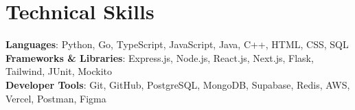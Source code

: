\section{Technical Skills}
\begin{itemize}[leftmargin=0.15in, label={}]
    \small{\item{     
        \textbf{Languages}{: Python, Go, TypeScript, JavaScript, Java, C++, HTML, CSS, SQL} \\
     
        \textbf{Frameworks \& Libraries}{: Express.js, Node.js, React.js, Next.js, Flask, Tailwind, JUnit, Mockito} \\

        \textbf{Developer Tools}{: Git, GitHub, PostgreSQL, MongoDB, Supabase, Redis, AWS, Vercel, Postman, Figma} \\
    }}
\end{itemize}